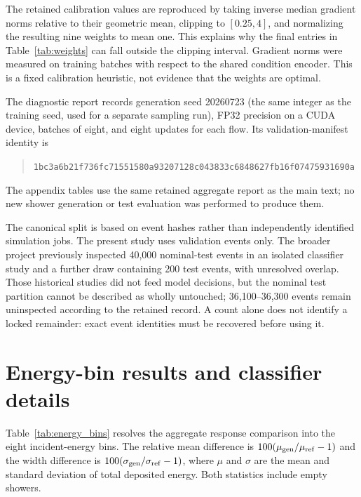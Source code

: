 \documentclass[11pt]{article}
\begin{document}
The retained calibration values are reproduced by taking inverse median gradient norms relative to their geometric mean, clipping to $[0.25,4]$, and normalizing the resulting nine weights to mean one. This explains why the final entries in Table~\ref{tab:weights} can fall outside the clipping interval. Gradient norms were measured on training batches with respect to the shared condition encoder. This is a fixed calibration heuristic, not evidence that the weights are optimal.

The diagnostic report records generation seed 20260723 (the same integer as the training seed, used for a separate sampling run), FP32 precision on a CUDA device, batches of eight, and eight updates for each flow. Its validation-manifest identity is
\begin{quote}\footnotesize\nolinkurl{1bc3a6b21f736fc71551580a93207128c043833c6848627fb16f07475931690a}\end{quote}
The appendix tables use the same retained aggregate report as the main text; no new shower generation or test evaluation was performed to produce them.

The canonical split is based on event hashes rather than independently identified simulation jobs. The present study uses validation events only. The broader project previously inspected 40,000 nominal-test events in an isolated classifier study and a further draw containing 200 test events, with unresolved overlap. Those historical studies did not feed model decisions, but the nominal test partition cannot be described as wholly untouched; 36,100--36,300 events remain uninspected according to the retained record. A count alone does not identify a locked remainder: exact event identities must be recovered before using it.

\clearpage
\section{Energy-bin results and classifier details}
\label{app:additional}

Table~\ref{tab:energy_bins} resolves the aggregate response comparison into the eight incident-energy bins. The relative mean difference is $100(\mu_{\rm gen}/\mu_{\rm ref}-1)$ and the width difference is $100(\sigma_{\rm gen}/\sigma_{\rm ref}-1)$, where $\mu$ and $\sigma$ are the mean and standard deviation of total deposited energy. Both statistics include empty showers.
\end{document}
